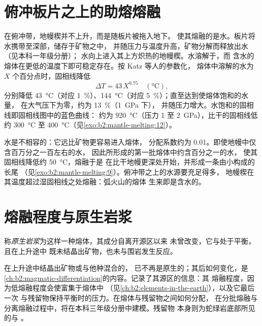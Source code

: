 \section{俯冲板片之上的助熔熔融}\label{sec:b2:mantle-melting:flux}

在俯冲带，地幔楔并不上升，而是随板片被拖入地下。
使其熔融的是水。板片将水携带至深部，储存于矿物之中，
并随压力与温度升高，矿物分解而释放出水（见本科一年级分册）；
水向上进入其上方炽热的地幔楔。水溶解于，而
含水的熔体在更低的温度下即可稳定存在。按 Katz 等人的参数化，
熔体中溶解的水为 $X$ 个百分点时，固相线降低
\[
  \Delta T = 43\,X^{0.75} \quad (\unit{\celsius}),
\]
分别降低 \qty{43}{\celsius}（对应 \qty{1}{\percent}）、\qty{144}{\celsius}（对应
\qty{5}{\percent}）；直至达到使熔体饱和的水量，
在大气压下为零，约为 \qty{13}{\percent}（\qty{1}{GPa} 下），
并随压力增大。水饱和的固相线即固相线图中的蓝色曲线：
约为 \qty{920}{\celsius}（压力 1 至 \qty{2}{GPa}），比干的固相线低约 \qty{300}{\celsius} 至
\qty{400}{\celsius}（见\cref{exo:b2:mantle-melting:12}）。

水是不相容的：它远比矿物更容易进入熔体，
分配系数约为 0.01。即使地幔中仅含百万分之一百左右的水，
因此所形成的第一批熔体中约含百分之一的水，
使其固相线降低约 \qty{50}{\celsius}，熔融于是
在比干地幔更深处开始，并形成一条由小构成的长尾
（见\cref{exo:b2:mantle-melting:9}）。俯冲带之上的水源要充足得多，
地幔楔在其温度超过湿固相线之处熔融：弧火山的熔体
生来即是含水的。

\section{熔融程度与原生岩浆}\label{sec:b2:mantle-melting:primary}

\begin{definition}[原生岩浆]\label{def:b2:mantle-melting:primary}
称\emph{原生岩浆}为这样一种熔体，其成分自离开源区以来
未曾改变，它与处于平衡，且在上升途中
既未结晶出矿物，也未与围岩发生反应。
\end{definition}

在上升途中结晶出矿物或与他种混合的，
已不再是原生的；其后如何变化，是
\cref{ch:b2:magmatic-differentiation}的内容。记录了其源区的信息：其
熔融程度，因为低熔融程度会使富集于熔体中
（见\cref{ch:b2:elements-in-the-earth}），以及它最后一次
与残留物保持平衡时的压力。在熔体与残留物之间如何分配，
在分批熔融与分离熔融过程中，将在本科三年级分册中建模。残留物
本身则为蛇绿岩底部所见的与
。

